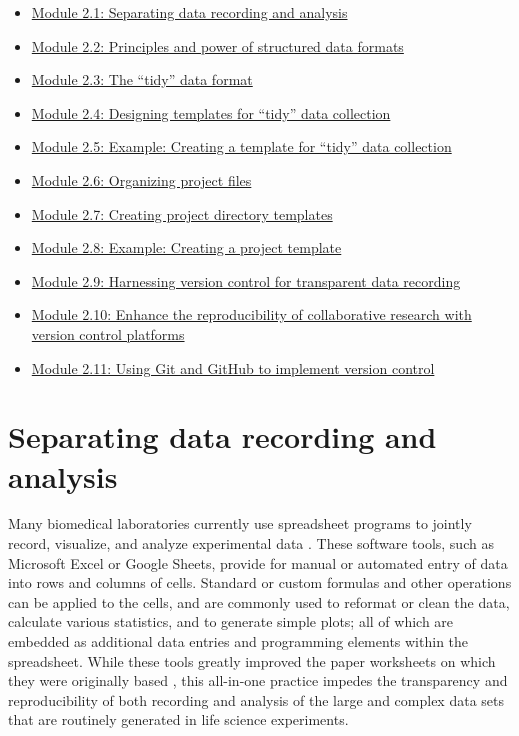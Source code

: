 \documentclass[]{tufte-book}
\providecommand{\tightlist}{%
  \setlength{\itemsep}{0pt}\setlength{\parskip}{0pt}}
\begin{document}
\begin{itemize}
\tightlist
\item
  \hyperref[module1]{Module 2.1: Separating data recording and analysis}
\item
  \hyperref[module2]{Module 2.2: Principles and power of structured data formats}
\item
  \hyperref[module3]{Module 2.3: The ``tidy'' data format}
\item
  \hyperref[module4]{Module 2.4: Designing templates for ``tidy'' data collection}
\item
  \hyperref[module5]{Module 2.5: Example: Creating a template for ``tidy'' data collection}
\item
  \hyperref[module6]{Module 2.6: Organizing project files}
\item
  \hyperref[module7]{Module 2.7: Creating project directory templates}
\item
  \hyperref[module8]{Module 2.8: Example: Creating a project template}
\item
  \hyperref[module9]{Module 2.9: Harnessing version control for transparent data recording}
\item
  \hyperref[module10]{Module 2.10: Enhance the reproducibility of collaborative research with version control platforms}
\item
  \hyperref[module11]{Module 2.11: Using Git and GitHub to implement version control}
\end{itemize}

\section{Separating data recording and analysis}\label{module1}

Many biomedical laboratories currently use spreadsheet programs to jointly
record, visualize, and analyze experimental data \citep{broman2018data}. These
software tools, such as Microsoft Excel or Google Sheets, provide for manual or
automated entry of data into rows and columns of cells. Standard or custom
formulas and other operations can be applied to the cells, and are commonly used
to reformat or clean the data, calculate various statistics, and to generate
simple plots; all of which are embedded as additional data entries and
programming elements within the spreadsheet. While these tools greatly improved
the paper worksheets on which they were originally based \citep{campbell2007number},
this all-in-one practice impedes the transparency and reproducibility of both
recording and analysis of the large and complex data sets that are routinely
generated in life science experiments.
\end{document}
